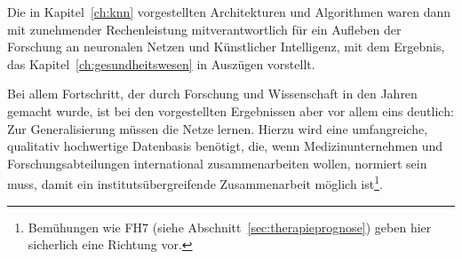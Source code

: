 Die in Kapitel~\ref{ch:knn} vorgestellten Architekturen und Algorithmen waren dann mit zunehmender Rechenleistung mitverantwortlich für ein Aufleben der Forschung an neuronalen Netzen und Künstlicher Intelligenz, mit dem Ergebnis, das Kapitel~\ref{ch:gesundheitswesen} in Auszügen vorstellt.

Bei allem Fortschritt, der durch Forschung und Wissenschaft in den Jahren gemacht wurde, ist bei den vorgestellten Ergebnissen aber vor allem eins deutlich: Zur Generalisierung müssen die Netze lernen.
Hierzu wird eine umfangreiche, qualitativ hochwertige Datenbasis benötigt, die, wenn Medizinunternehmen und Forschungsabteilungen international zusammenarbeiten wollen, normiert sein muss, damit ein institutsübergreifende Zusammenarbeit möglich ist\footnote {
    Bemühungen wie FH7 (siehe Abschnitt~\ref{sec:therapieprognose}) geben hier sicherlich eine Richtung vor.
}.













%
%
%
%

